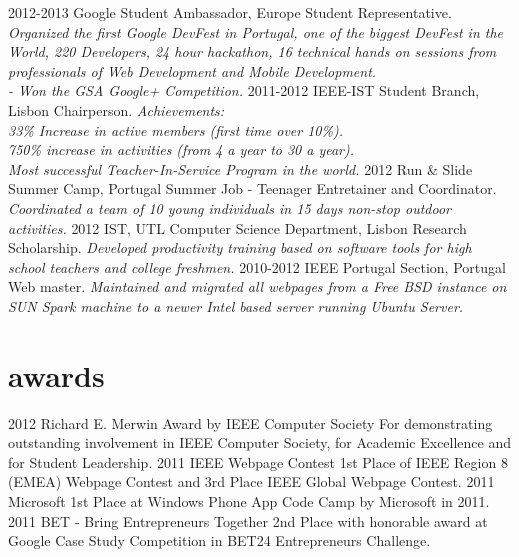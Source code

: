 \documentclass[]{friggeri-cv}
\begin{document}
\begin{entrylist} 
  \entry
    {2012-2013}
    {Google Student Ambassador, Europe}
    {Student Representative.}
    {\emph{Organized the first Google DevFest in Portugal, one of the biggest DevFest in the World, 220 Developers, 24 hour hackathon, 16 technical hands on sessions from professionals of Web Development and Mobile Development.\\
    - Won the GSA Google+ Competition.}}
  \entry
    {2011-2012}
    {IEEE-IST Student Branch, Lisbon}
    {Chairperson.}
    {\emph{Achievements:  \\
      33\% Increase in active members (first time over 10\%).\\
      750\% increase in activities (from 4 a year to 30 a year).\\
      Most successful Teacher-In-Service Program in the world.}}      
  \entry
     {2012}
     {Run \& Slide Summer Camp, Portugal}
     {Summer Job - Teenager Entretainer and Coordinator.}
     {\emph{Coordinated a team of 10 young individuals in 15 days non-stop outdoor activities.}}
  \entry
    {2012}
    {IST, UTL Computer Science Department, Lisbon}
    {Research Scholarship.}
    {\emph{Developed productivity training based on software tools for high school teachers and college freshmen.}}
  \entry
    {2010-2012}
    {IEEE Portugal Section, Portugal}
    {Web master.}
    {\emph{Maintained and migrated all webpages from a Free BSD instance on SUN Spark machine to a newer Intel based server running Ubuntu Server.}}

\end{entrylist}

\section{awards}

\begin{entrylist}
  \entry
    {2012}
    {Richard E. Merwin Award by IEEE Computer Society}
    {}
    {For demonstrating outstanding involvement in IEEE Computer Society, for Academic Excellence and for Student Leadership.}
  \entry
    {2011}
    {IEEE Webpage Contest}
    { }
    {1st Place of IEEE Region 8 (EMEA) Webpage Contest and 3rd Place IEEE Global Webpage Contest.}
  \entry
    {2011}
    {Microsoft}
    {}
    {1st Place at Windows Phone App Code Camp by Microsoft in 2011.}
  \entry
    {2011}
    {BET - Bring Entrepreneurs Together}
    {}
    {2nd Place with honorable award at Google Case Study Competition in BET24 Entrepreneurs Challenge.}    
\end{entrylist}

\end{document}

